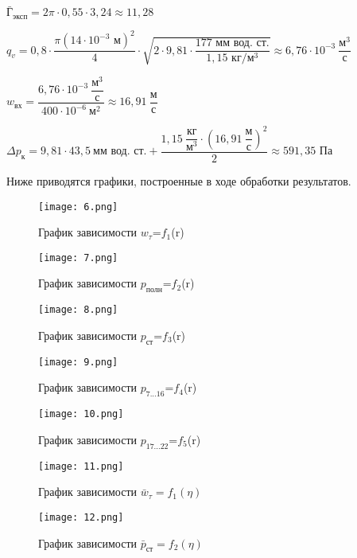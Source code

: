 \documentclass[12pt,a4paper]{article}
\begin{document}
\begin{spacing}{2.5}
$\bar {\text{Г}}_{\text{эксп}}= 2\pi \cdot 0,55 \cdot 3,24  \approx 11,28$

$q_v=0,8\cdot \dfrac{\pi \left(14 \cdot 10^{-3} \text{ м}\right)^2}{4} \cdot \sqrt{2\cdot 9,81 \cdot\dfrac{177\text{ мм вод. ст.}}{1,15 \text{ кг/м$^3$}}} \approx 6,76\cdot10^{-3}\ \dfrac{\text{м}^3}{\text{с}} $

$w_{\text{вх}} = \dfrac{6,76\cdot10^{-3}\ \dfrac{\text{м}^3}{\text{с}}}{400\cdot 10^{-6}\ \text{м}^2} \approx 16,91\ \dfrac{\text{м}}{\text{с}} $
\end{spacing}
$\Delta p_{\text{к}} = 9,81 \cdot 43,5\ \text{мм вод. ст.} + \dfrac{1,15\ \dfrac{\text{кг}}{\text{м}^3} \cdot \left(16,91\ \dfrac{\text{м}}{\text{с}}\right)^2}{2} \approx 591,35 \text{ Па}$

Ниже приводятся графики, построенные в ходе обработки результатов.

\begin{figure}[h]\center
\texttt{[image: 6.png]}
\caption{График зависимости $w_{\tau}$=$f_1$(r)} \label{fig:3}
\end{figure}

\begin{figure}[h]\center
\texttt{[image: 7.png]}
\caption{График зависимости $p_{\text{полн}}$=$f_2$(r)} \label{fig:3}
\end{figure}

\begin{figure}[h]\center
\texttt{[image: 8.png]}
\caption{График зависимости $p_{\text{ст}}$=$f_3$(r)} \label{fig:3}
\end{figure}

\begin{figure}[h]\center
\texttt{[image: 9.png]}
\caption{График зависимости $p_{\text{7...16}}$=$f_4$(r)} \label{fig:3}
\end{figure}

\begin{figure}[h]\center
\texttt{[image: 10.png]}
\caption{График зависимости $p_{\text{17...22}}$=$f_5$(r)} \label{fig:3}
\end{figure}

\begin{figure}[h]\center
\texttt{[image: 11.png]}
\caption{График зависимости $\bar w_{\tau}=f_1(\eta) $}\label{fig:3}
\end{figure}

\begin{figure}[h]\center
\texttt{[image: 12.png]}
\caption{График зависимости $\bar p_{\text{ст}}=f_2(\eta) $}\label{fig:3}
\end{figure}
\end{document}
